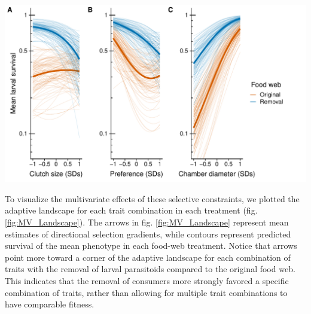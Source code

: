 \documentclass[11pt,]{article}
\let\origfigure\figure
\let\endorigfigure\endfigure
\renewenvironment{figure}[1][2] {
    \expandafter\origfigure\expandafter[H]
} {
    \endorigfigure
}
\begin{document}
\begin{figure}
\centering
\includegraphics{../analyses/UV_landscapes.pdf}
\caption{\label{fig:UV_Landscape}Adaptive landscape of gall midge
phenotypes in the original food web and with the removal of larval
parasitoids. Each panel corresponds to a different phenotypic trait:
clutch size (A); oviposition preference (B); and chamber diameter (C).
Bold lines represent selection experienced in the original (orange) and
removal (blue) food webs. Thin lines represent bootstrapped replicates
to show the uncertainty in selection. For clarity, we only display 100
bootstraps even though inferences are based on 1,000 replicates. Note
that mean larval survival is plotted on a natural log scale to reflect
the mathematical definition of the adaptive landscape.}
\end{figure}

\bigskip

To visualize the multivariate effects of these selective constraints, we
plotted the adaptive landscape for each trait combination in each
treatment (fig. \ref{fig:MV_Landscape}). The arrows in fig.
\ref{fig:MV_Landscape} represent mean estimates of directional selection
gradients, while contours represent predicted survival of the mean
phenotype in each food-web treatment. Notice that arrows point more
toward a corner of the adaptive landscape for each combination of traits
with the removal of larval parasitoids compared to the original food
web. This indicates that the removal of consumers more strongly favored
a specific combination of traits, rather than allowing for multiple
trait combinations to have comparable fitness.
\end{document}
